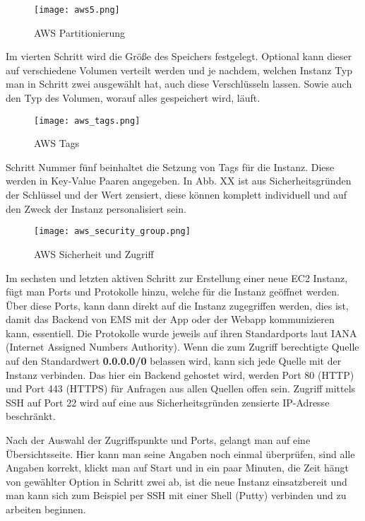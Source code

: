 \begin{center}
\begin{figure}[h]
    \centering
    \texttt{[image: aws5.png]}
    \caption{AWS Partitionierung}
\end{figure}
\end{center}

Im vierten Schritt wird die Größe des Speichers festgelegt. Optional kann dieser auf verschiedene Volumen verteilt werden und je nachdem, welchen Instanz Typ man in Schritt zwei ausgewählt hat, auch diese Verschlüsseln lassen. Sowie auch den Typ des Volumen, worauf alles gespeichert wird, läuft.

\begin{center}
\begin{figure}[h]
    \centering
    \texttt{[image: aws\_tags.png]}
    \caption{AWS Tags}
\end{figure}
\end{center}

Schritt Nummer fünf beinhaltet die Setzung von Tags für die Instanz. Diese werden in Key-Value Paaren angegeben. In Abb. XX ist aus Sicherheitsgründen der Schlüssel und der Wert zensiert, diese können komplett individuell und auf den Zweck der Instanz personalisiert sein.

\begin{center}
\begin{figure}[h]
    \centering
    \texttt{[image: aws\_security\_group.png]}
    \caption{AWS Sicherheit und Zugriff}
\end{figure}
\end{center}

Im sechsten und letzten aktiven Schritt zur Erstellung einer neue EC2 Instanz, fügt man Ports und Protokolle hinzu, welche für die Instanz geöffnet werden. Über diese Ports, kann dann direkt auf die Instanz zugegriffen werden, dies ist, damit das Backend von EMS mit der App oder der Webapp kommunizieren kann, essentiell. Die Protokolle wurde jeweils auf ihren Standardports laut IANA (Internet Assigned Numbers Authority). Wenn die zum Zugriff berechtigte Quelle auf den Standardwert \textbf{0.0.0.0/0} belassen wird, kann sich jede Quelle mit der Instanz verbinden.
Das hier ein Backend gehostet wird, werden Port 80 (HTTP) und Port 443 (HTTPS) für Anfragen aus allen Quellen offen sein. Zugriff mittels SSH auf Port 22 wird auf eine aus Sicherheitsgründen zensierte IP-Adresse beschränkt.

Nach der Auswahl der Zugriffspunkte und Ports, gelangt man auf eine Übersichtsseite. Hier kann man seine Angaben noch einmal überprüfen, sind alle Angaben korrekt, klickt man auf Start und in ein paar Minuten, die Zeit hängt von gewählter Option in Schritt zwei ab, ist die neue Instanz einsatzbereit und man kann sich zum Beispiel per SSH mit einer Shell (Putty) verbinden und zu arbeiten beginnen. 

